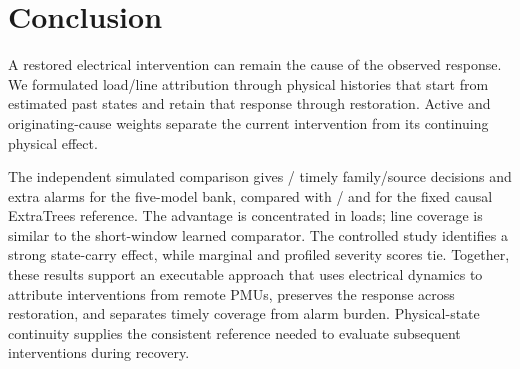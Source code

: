 \section{Conclusion}
\label{sec:conclusion}

A restored electrical intervention can remain the cause of the observed
response. We formulated load/line attribution through physical histories
that start from estimated past states and retain that response through
restoration. Active and originating-cause weights separate the current
intervention from its continuing physical effect.

The independent simulated comparison gives
\COneMixTimely{}/\COneMixTotal{} timely family/source decisions and
\COneMixExtras{} extra alarms for the five-model bank, compared with
\COneETTimely{}/\COneETTotal{} and \COneETExtras{} for the fixed causal
ExtraTrees reference. The advantage is concentrated in loads; line
coverage is similar to the short-window learned comparator. The controlled
study identifies a strong state-carry effect, while marginal and profiled
severity scores tie. Together, these results support an executable approach that uses
electrical dynamics to attribute interventions from remote PMUs, preserves
the response across restoration, and separates timely coverage from alarm
burden. Physical-state continuity supplies the consistent reference needed
to evaluate subsequent interventions during recovery.
